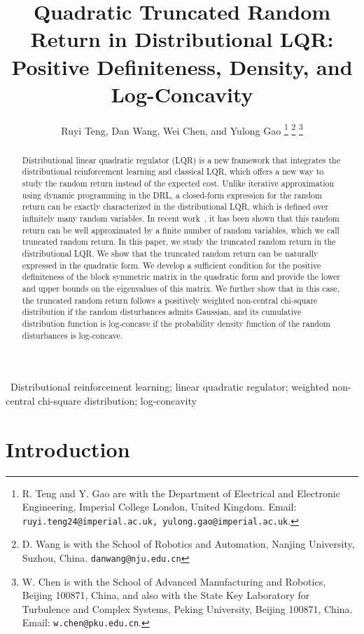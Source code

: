 \documentclass[letterpaper, 10 pt, conference]{ieeeconf}  %
\title{\LARGE \bf
Quadratic Truncated Random Return in Distributional LQR: \\ Positive Definiteness, Density, and Log-Concavity
}
\author{Ruyi Teng, Dan Wang, Wei Chen, and Yulong Gao
  \thanks{R. Teng and Y. Gao are
    with the Department of Electrical and Electronic Engineering,
Imperial College London, United Kingdom. Email: \texttt{ruyi.teng24@imperial.ac.uk, yulong.gao@imperial.ac.uk}. }
\thanks{D. Wang is with the School of Robotics and Automation, Nanjing University, Suzhou, China. {\tt\small danwang@nju.edu.cn}}
\thanks{W. Chen is with the School of Advanced Manufacturing and Robotics, Beijing 100871, China, and also
 with the State Key Laboratory for Turbulence and Complex Systems,
 Peking University, Beijing 100871, China. Email: \texttt{w.chen@pku.edu.cn}. }}
\begin{document}
\maketitle
\thispagestyle{empty}
\pagestyle{empty}


\begin{abstract}

Distributional linear quadratic regulator (LQR) is a new framework that integrates the distributional reinforcement learning and classical LQR, which offers a new way to study the random return instead of the expected cost. Unlike iterative approximation using dynamic programming in the DRL, a closed-form expression for the random return can be exactly characterized in the distributional LQR, which is defined over infinitely many random variables. In recent work~\cite{wang2023policy,wang2023policyL4dc}, it has been shown that this random return can be well approximated by a finite number of random variables, which we call truncated random return. In this paper, we study the truncated random return in the distributional LQR. We show that the truncated random return can be naturally expressed in the quadratic form.  We develop a sufficient condition for the positive definiteness of the block symmetric matrix in the quadratic form and provide the lower and upper bounds on the eigenvalues of this matrix. We further show that in this case, the truncated random return follows a positively weighted non-central chi-square distribution if the random disturbances admits Gaussian, and its cumulative  distribution function is log-concave if the probability density function of the random disturbances is log-concave. 

\end{abstract}

\begin{keywords}
		~Distributional reinforcement learning; linear quadratic regulator; weighted non-central chi-square distribution; log-concavity
	\end{keywords}
\section{Introduction}

% 
\end{document}
